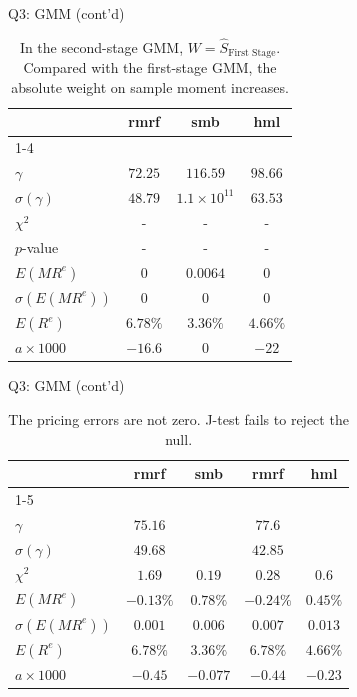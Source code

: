 \documentclass[10pt,t]{beamer}
\begin{document}
\begin{frame}{Q3: GMM (cont'd)}
\begin{table}
\begin{tabular}{lccc}
\toprule
& rmrf & smb & hml \\
\cmidrule{1-4}
\multicolumn{4}{l}{second-stage GMM} \\
$\gamma$ & $72.25$ & $116.59$ & $98.66$\\
$\sigma(\gamma)$ & $48.79$ & $1.1 \times 10^{11}$ & $63.53$\\
$\chi^2$ & - & - & - \\
$p$-value & - & - & - \\
$E(MR^e)$ & $0$ & $0.0064$ & $0$ \\
$\sigma(E(MR^e))$ & $0$ & $0$ & $0$ \\
$E(R^e)$ & $6.78\%$ & $3.36\%$ & $4.66\%$\\
$a\times 1000$ & $-16.6$ & $0$ & $-22$ \\
\bottomrule
\end{tabular}
\caption{In the second-stage GMM, $W = \hat{S}_{\text{First Stage}}$. Compared with the first-stage GMM, the absolute weight on sample moment increases.}
\end{table}
\end{frame}


\begin{frame}{Q3: GMM (cont'd)}
\begin{table}
\begin{tabular}{lcccc}
\toprule
& rmrf & smb & rmrf & hml \\
\cmidrule{1-5}
\multicolumn{5}{l}{first-stage GMM} \\
$\gamma$ & $75.16$ &  & $77.6$ & \\
$\sigma(\gamma)$ & $49.68$ & & $42.85$ & \\
$\chi^2$ & $1.69$ & $0.19$ & $0.28$ & $0.6$ \\
$E(MR^e)$ & $-0.13\%$ & $0.78\%$ & $-0.24\%$ & $0.45\%$\\
$\sigma(E(MR^e))$ & $0.001$ & $0.006$ & $0.007$ & $0.013$\\
$E(R^e)$ & $6.78\%$ & $3.36\%$ & $6.78\%$ & $4.66\%$\\
$a\times 1000$ & $-0.45$ & $-0.077$ & $-0.44$ & $-0.23$\\
\bottomrule
\end{tabular}
\caption{The pricing errors are not zero. J-test fails to reject the null.}
\end{table}
\end{frame}
\end{document}
